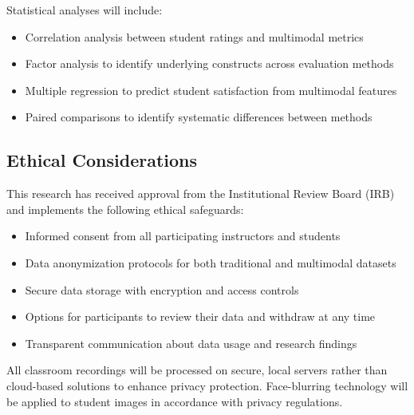 Statistical analyses will include:
\begin{itemize}
    \item Correlation analysis between student ratings and multimodal metrics
    \item Factor analysis to identify underlying constructs across evaluation methods
    \item Multiple regression to predict student satisfaction from multimodal features
    \item Paired comparisons to identify systematic differences between methods
\end{itemize}

\subsection{Ethical Considerations}
This research has received approval from the Institutional Review Board (IRB) and implements the following ethical safeguards:
\begin{itemize}
    \item Informed consent from all participating instructors and students
    \item Data anonymization protocols for both traditional and multimodal datasets
    \item Secure data storage with encryption and access controls
    \item Options for participants to review their data and withdraw at any time
    \item Transparent communication about data usage and research findings
\end{itemize}

All classroom recordings will be processed on secure, local servers rather than cloud-based solutions to enhance privacy protection. Face-blurring technology will be applied to student images in accordance with privacy regulations.

